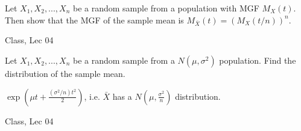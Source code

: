 \begin{samepage}
\begin{ex}
    Let $X_1, X_2, ..., X_n$ be a random sample from a population with MGF $M_X(t)$. Then show that the MGF of the sample mean is $M_{\bar{X}} (t) = (M_X (t/n))^n$.
\end{ex}
\begin{source}
Class, Lec 04
\end{source}
\end{samepage}
\begin{samepage}
    \begin{ex}
        Let $X_1, X_2, ..., X_n$ be a random sample from a $N(\mu, \sigma^2)$ population. Find the distribution of the sample mean.
    \end{ex}
    \begin{ans}
        $\exp({\mu t + \frac{(\sigma^2 / n)t^2}{2}})$, i.e. $\bar{X}$ has a $N(\mu, \frac{\sigma^2}{n})$ distribution.
    \end{ans}
    \begin{source}
        Class, Lec 04
    \end{source}
\end{samepage}
